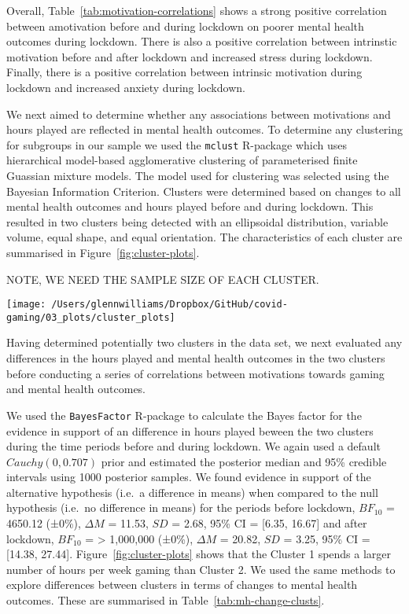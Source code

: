 \documentclass[
  english,
  jou,floatsintext]{apa6}
\begin{document}
Overall, Table~\ref{tab:motivation-correlations} shows a strong positive correlation between amotivation before and during lockdown on poorer mental health outcomes during lockdown. There is also a positive correlation between intrinstic motivation before and after lockdown and increased stress during lockdown. Finally, there is a positive correlation between intrinsic motivation during lockdown and increased anxiety during lockdown.

We next aimed to determine whether any associations between motivations and hours played are reflected in mental health outcomes. To determine any clustering for subgroups in our sample we used the \texttt{mclust} R-package which uses hierarchical model-based agglomerative clustering of parameterised finite Guassian mixture models. The model used for clustering was selected using the Bayesian Information Criterion. Clusters were determined based on changes to all mental health outcomes and hours played before and during lockdown. This resulted in two clusters being detected with an ellipsoidal distribution, variable volume, equal shape, and equal orientation. The characteristics of each cluster are summarised in Figure~\ref{fig:cluster-plots}.

NOTE, WE NEED THE SAMPLE SIZE OF EACH CLUSTER.

\begin{figure*}[!htbp]

{\centering \texttt{[image: /Users/glennwilliams/Dropbox/GitHub/covid-gaming/03\_plots/cluster\_plots]} 

}

\caption{ }\label{fig:cluster-plots}
\end{figure*}

Having determined potentially two clusters in the data set, we next evaluated any differences in the hours played and mental health outcomes in the two clusters before conducting a series of correlations between motivations towards gaming and mental health outcomes.

We used the \texttt{BayesFactor} R-package to calculate the Bayes factor for the evidence in support of an difference in hours played beween the two clusters during the time periods before and during lockdown. We again used a default \(Cauchy(0, 0.707)\) prior and estimated the posterior median and 95\% credible intervals using 1000 posterior samples. We found evidence in support of the alternative hypothesis (i.e.~a difference in means) when compared to the null hypothesis (i.e.~no difference in means) for the periods before lockdown, \(BF_{10}\) = 4650.12 (±0\%), \(\Delta{M}\) = 11.53, \(SD\) = 2.68, 95\% CI = {[}6.35, 16.67{]} and after lockdown, \(BF_{10}\) = \textgreater{} 1,000,000 (±0\%), \(\Delta{M}\) = 20.82, \(SD\) = 3.25, 95\% CI = {[}14.38, 27.44{]}. Figure~\ref{fig:cluster-plots} shows that the Cluster 1 spends a larger number of hours per week gaming than Cluster 2. We used the same methods to explore differences between clusters in terms of changes to mental health outcomes. These are summarised in Table~\ref{tab:mh-change-clusts}.
\end{document}
